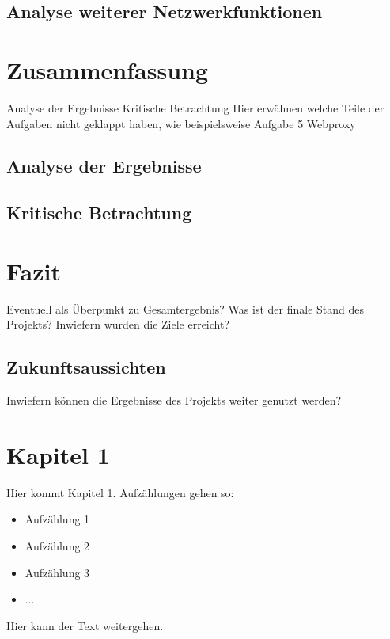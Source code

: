 \documentclass[fontsize=12pt,paper=a4,open=any,parskip=half,
  twoside=false,toc=listof,toc=bibliography,fleqn,leqno,
  captions=nooneline,captions=tableabove,british]{scrbook}
\begin{document}
\section{Analyse weiterer Netzwerkfunktionen}

\chapter{Zusammenfassung}
Analyse der Ergebnisse
Kritische Betrachtung
Hier erwähnen welche Teile der Aufgaben nicht geklappt haben, wie beispielsweise Aufgabe 5 Webproxy
\section{Analyse der Ergebnisse}
\section{Kritische Betrachtung}

\chapter{Fazit}\label{ch:fazit}
Eventuell als Überpunkt zu Gesamtergebnis?
Was ist der finale Stand des Projekts?
Inwiefern wurden die Ziele erreicht?

\section{Zukunftsaussichten}
Inwiefern können die Ergebnisse des Projekts weiter genutzt werden?
\par























\chapter{Kapitel 1}\label{ch:j.u}
Hier kommt Kapitel 1. Aufzählungen gehen so:
\begin{itemize}
 \item Aufzählung 1
 \item Aufzählung 2
 \item Aufzählung 3
 \item ...
\end{itemize}
Hier kann der Text weitergehen.
\end{document}
